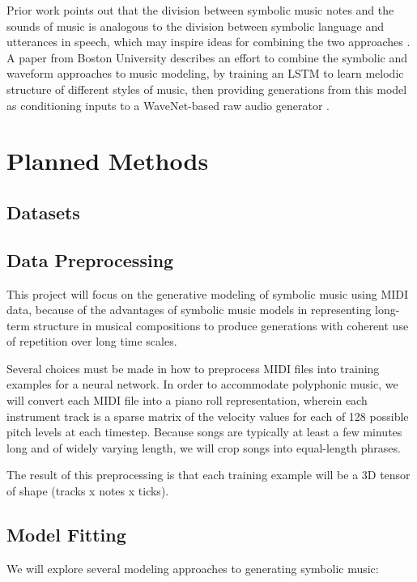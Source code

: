 \documentclass[sigconf,authorversion]{acmart}
\begin{document}
Prior work points out that the division between symbolic music notes and the
sounds of music is analogous to the division between symbolic language and
utterances in speech, which may inspire ideas for combining the two approaches
\cite{hawthorne2019enabling}. A paper from Boston University describes an effort
to combine the symbolic and waveform approaches to music modeling, by training
an LSTM to learn melodic structure of different styles of music, then providing
generations from this model as conditioning inputs to a WaveNet-based raw audio
generator \cite{manzelli_conditioning_2018}.

\section{Planned Methods}

\subsection{Datasets}

\subsection{Data Preprocessing}

This project will focus on the generative modeling of symbolic music using MIDI
data, because of the advantages of symbolic music models in representing
long-term structure in musical compositions to produce generations with coherent
use of repetition over long time scales.

Several choices must be made in how to preprocess MIDI files into training
examples for a neural network. In order to accommodate polyphonic music, we will
convert each MIDI file into a piano roll representation, wherein each instrument
track is a sparse matrix of the velocity values for each of 128 possible pitch
levels at each timestep. Because songs are typically at least a few minutes long
and of widely varying length, we will crop songs into equal-length phrases.

The result of this preprocessing is that each training example will be a 3D
tensor of shape (tracks x notes x ticks).

\subsection{Model Fitting}

We will explore several modeling approaches to generating symbolic music:
\end{document}
